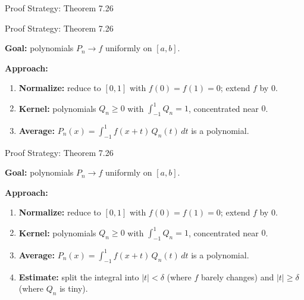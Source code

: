 \documentclass[aspectratio=169,12pt,t]{beamer}
\begin{document}
{\begin{frame}{Proof Strategy: Theorem 7.26}
\end{frame}

\begin{frame}{Proof Strategy: Theorem 7.26}
  \begin{hlbox}
  \textbf{Goal:} polynomials $P_n \to f$ uniformly on $[a,b]$.

  \vspace{0.6em}
  \textbf{Approach:}
  \begin{enumerate}\setlength{\itemsep}{0.5em}
    \item \textbf{Normalize:} reduce to $[0,1]$ with $f(0) = f(1) = 0$; extend $f$ by $0$.
    \item \textbf{Kernel:} polynomials $Q_n \ge 0$ with $\int_{-1}^{1} Q_n = 1$,
      concentrated near $0$.
    \item \textbf{Average:} $P_n(x) = \int_{-1}^{1} f(x+t)\,Q_n(t)\,dt$ is a polynomial.
  \end{enumerate}
  \end{hlbox}

\end{frame}

\begin{frame}{Proof Strategy: Theorem 7.26}
  \begin{hlbox}
  \textbf{Goal:} polynomials $P_n \to f$ uniformly on $[a,b]$.

  \vspace{0.6em}
  \textbf{Approach:}
  \begin{enumerate}\setlength{\itemsep}{0.5em}
    \item \textbf{Normalize:} reduce to $[0,1]$ with $f(0) = f(1) = 0$; extend $f$ by $0$.
    \item \textbf{Kernel:} polynomials $Q_n \ge 0$ with $\int_{-1}^{1} Q_n = 1$,
      concentrated near $0$.
    \item \textbf{Average:} $P_n(x) = \int_{-1}^{1} f(x+t)\,Q_n(t)\,dt$ is a polynomial.
    \item \textbf{Estimate:} split the integral into $|t| < \delta$ (where $f$ barely
      changes) and $|t| \ge \delta$ (where $Q_n$ is tiny).
  \end{enumerate}
  \end{hlbox}


\end{frame}}
\end{document}
